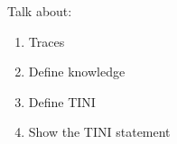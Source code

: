 Talk about:
\begin{enumerate}
    \item Traces
    \item Define knowledge
    \item Define TINI
    \item Show the TINI statement
\end{enumerate}